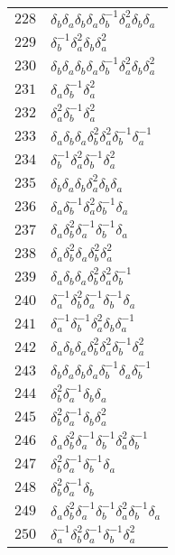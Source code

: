 \documentclass{article}
\begin{document}
\begin{center}
\begin{tabular}{ll}
$228$ & $\delta_b^{}\delta_a^{}\delta_b^{}\delta_a^{}\delta_b^{-1}\delta_a^{2}\delta_b^{}\delta_a^{}$ \\
$229$ & $\delta_b^{-1}\delta_a^{2}\delta_b^{}\delta_a^{2}$ \\
$230$ & $\delta_b^{}\delta_a^{}\delta_b^{}\delta_a^{}\delta_b^{-1}\delta_a^{2}\delta_b^{}\delta_a^{2}$ \\
$231$ & $\delta_a^{}\delta_b^{-1}\delta_a^{2}$ \\
$232$ & $\delta_a^{2}\delta_b^{-1}\delta_a^{2}$ \\
$233$ & $\delta_a^{}\delta_b^{}\delta_a^{}\delta_b^{2}\delta_a^{2}\delta_b^{-1}\delta_a^{-1}$ \\
$234$ & $\delta_b^{-1}\delta_a^{2}\delta_b^{-1}\delta_a^{2}$ \\
$235$ & $\delta_b^{}\delta_a^{}\delta_b^{}\delta_a^{2}\delta_b^{}\delta_a^{}$ \\
$236$ & $\delta_a^{}\delta_b^{-1}\delta_a^{2}\delta_b^{-1}\delta_a^{}$ \\
$237$ & $\delta_a^{}\delta_b^{2}\delta_a^{-1}\delta_b^{-1}\delta_a^{}$ \\
$238$ & $\delta_a^{}\delta_b^{2}\delta_a^{}\delta_b^{2}\delta_a^{2}$ \\
$239$ & $\delta_a^{}\delta_b^{}\delta_a^{}\delta_b^{2}\delta_a^{2}\delta_b^{-1}$ \\
$240$ & $\delta_a^{-1}\delta_b^{2}\delta_a^{-1}\delta_b^{-1}\delta_a^{}$ \\
$241$ & $\delta_a^{-1}\delta_b^{-1}\delta_a^{2}\delta_b^{}\delta_a^{-1}$ \\
$242$ & $\delta_a^{}\delta_b^{}\delta_a^{}\delta_b^{2}\delta_a^{2}\delta_b^{-1}\delta_a^{2}$ \\
$243$ & $\delta_b^{}\delta_a^{}\delta_b^{}\delta_a^{}\delta_b^{-1}\delta_a^{}\delta_b^{-1}$ \\
$244$ & $\delta_b^{2}\delta_a^{-1}\delta_b^{}\delta_a^{}$ \\
$245$ & $\delta_b^{2}\delta_a^{-1}\delta_b^{}\delta_a^{2}$ \\
$246$ & $\delta_a^{}\delta_b^{2}\delta_a^{-1}\delta_b^{-1}\delta_a^{2}\delta_b^{-1}$ \\
$247$ & $\delta_b^{2}\delta_a^{-1}\delta_b^{-1}\delta_a^{}$ \\
$248$ & $\delta_b^{2}\delta_a^{-1}\delta_b^{}$ \\
$249$ & $\delta_a^{}\delta_b^{2}\delta_a^{-1}\delta_b^{-1}\delta_a^{2}\delta_b^{-1}\delta_a^{}$ \\
$250$ & $\delta_a^{-1}\delta_b^{2}\delta_a^{-1}\delta_b^{-1}\delta_a^{2}$ \\

\end{tabular}
\end{center}
\end{document}
